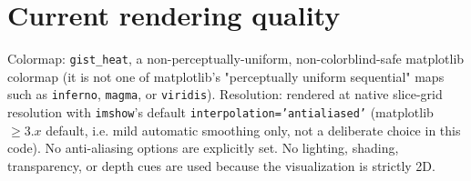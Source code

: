 \documentclass[11pt,a4paper]{report}
\begin{document}
\section{Current rendering quality}
\begin{factbox}
Colormap: \texttt{gist\_heat}, a non-perceptually-uniform, non-colorblind-safe matplotlib colormap
(it is not one of matplotlib's "perceptually uniform sequential" maps such as \texttt{inferno},
\texttt{magma}, or \texttt{viridis}). Resolution: rendered at native slice-grid resolution with
\texttt{imshow}'s default \texttt{interpolation='antialiased'} (matplotlib $\geq 3.x$ default, i.e.
mild automatic smoothing only, not a deliberate choice in this code). No anti-aliasing options are
explicitly set. No lighting, shading, transparency, or depth cues are used because the visualization is
strictly 2D.
\end{factbox}
\end{document}
